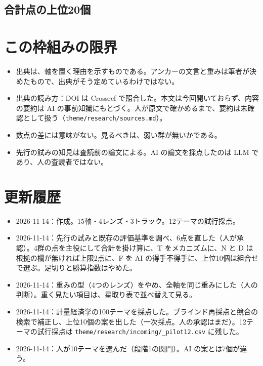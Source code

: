 \documentclass[a4paper,10pt]{ltjsarticle}
\begin{document}
\subsection{合計点の上位20個}



\section{この枠組みの限界}\label{sec:th-limit}

\begin{itemize}[leftmargin=*]
  \item 出典は、軸を置く理由を示すものである。アンカーの文言と重みは筆者が決めたもので、出典がそう定めているわけではない。
  \item 出典の読み方：DOI は Crossref で照合した。本文は今回開いておらず、内容の要約は AI の事前知識にもとづく。人が原文で確かめるまで、要約は未確認として扱う（\texttt{theme/research/sources.md}）。
  \item 数点の差には意味がない。見るべきは、弱い群が無いかである。
  \item 先行の試みの知見\parencite{li2026,zhu2026}は査読前の論文による。AI の論文を採点したのは LLM であり、人の査読者ではない。
\end{itemize}

\section*{更新履歴}
\begin{itemize}
  \item 2026-11-14：作成。15軸・4レンズ・3トラック。12テーマの試行採点。
  \item 2026-11-14：先行の試みと既存の評価基準を調べ、6点を直した（人が承認）。4群の点を主役にして合計を掛け算に、T をメカニズムに、N と D は根拠の欄が無ければ上限2点に、F を AI の得手不得手に、上位10個は組合せで選ぶ。足切りと勝算指数はやめた。
  \item 2026-11-14：重みの型（4つのレンズ）をやめ、全軸を同じ重みにした（人の判断）。重く見たい項目は、星取り表で並べ替えて見る。
  \item 2026-11-14：計量経済学の100テーマを採点した。ブラインド再採点と競合の検索で補正し、上位10個の案を出した（一次採点。人の承認はまだ）。12テーマの試行採点は \texttt{theme/research/incoming/\_pilot12.csv} に残した。
  \item 2026-11-14：人が10テーマを選んだ（段階1の関門）。AI の案とは7個が違う。
\end{itemize}

\printbibliography[title={参考文献}]
\end{document}
